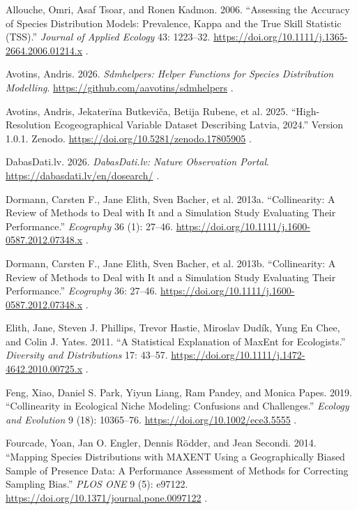 \documentclass[
  openany]{book}
\makeatletter
\newlength{\cslhangindent}
\newenvironment{CSLReferences}[2] %
 {\begin{list}{}{%
  \setlength{\itemindent}{0pt}
  \setlength{\leftmargin}{0pt}
  \setlength{\parsep}{0pt}
  \ifodd #1
   \setlength{\leftmargin}{\cslhangindent}
   \setlength{\itemindent}{-1\cslhangindent}
  \fi
  \setlength{\itemsep}{#2\baselineskip}}}
 {\end{list}}
\def\uline#1{#1}
\DeclareRobustCommand{\EGV@ulineblue}[1]{%
  \begingroup
  \color{linkblue}\uline{#1}%
  \endgroup
}
\let\EGV@oldurl\url
\renewcommand{\url}[1]{%
  \EGV@ulineblue{\EGV@oldurl{#1}}%
}
\makeatother
\begin{document}
\protect{}\label{refs}
\begin{CSLReferences}{1}{1}
Allouche, Omri, Asaf Tsoar, and Ronen Kadmon. 2006. {``Assessing the Accuracy of Species Distribution Models: Prevalence, Kappa and the True Skill Statistic (TSS).''} \emph{Journal of Applied Ecology} 43: 1223--32. \url{https://doi.org/10.1111/j.1365-2664.2006.01214.x}.

Avotins, Andris. 2026. \emph{Sdmhelpers: Helper Functions for Species Distribution Modelling}. \url{https://github.com/aavotins/sdmhelpers}.

Avotins, Andris, Jekaterīna Butkeviča, Betija Rubene, et al. 2025. {``High-Resolution Ecogeographical Variable Dataset Describing Latvia, 2024.''} Version 1.0.1. Zenodo. \url{https://doi.org/10.5281/zenodo.17805905}.

DabasDati.lv. 2026. \emph{DabasDati.lv: Nature Observation Portal}. \url{https://dabasdati.lv/en/dosearch/}.

Dormann, Carsten F., Jane Elith, Sven Bacher, et al. 2013a. {``Collinearity: A Review of Methods to Deal with It and a Simulation Study Evaluating Their Performance.''} \emph{Ecography} 36 (1): 27--46. \url{https://doi.org/10.1111/j.1600-0587.2012.07348.x}.

Dormann, Carsten F., Jane Elith, Sven Bacher, et al. 2013b. {``Collinearity: A Review of Methods to Deal with It and a Simulation Study Evaluating Their Performance.''} \emph{Ecography} 36: 27--46. \url{https://doi.org/10.1111/j.1600-0587.2012.07348.x}.

Elith, Jane, Steven J. Phillips, Trevor Hastie, Miroslav Dudík, Yung En Chee, and Colin J. Yates. 2011. {``A Statistical Explanation of MaxEnt for Ecologists.''} \emph{Diversity and Distributions} 17: 43--57. \url{https://doi.org/10.1111/j.1472-4642.2010.00725.x}.

Feng, Xiao, Daniel S. Park, Yiyun Liang, Ram Pandey, and Monica Papes. 2019. {``Collinearity in Ecological Niche Modeling: Confusions and Challenges.''} \emph{Ecology and Evolution} 9 (18): 10365--76. \url{https://doi.org/10.1002/ece3.5555}.

Fourcade, Yoan, Jan O. Engler, Dennis Rödder, and Jean Secondi. 2014. {``Mapping Species Distributions with MAXENT Using a Geographically Biased Sample of Presence Data: A Performance Assessment of Methods for Correcting Sampling Bias.''} \emph{PLOS ONE} 9 (5): e97122. \url{https://doi.org/10.1371/journal.pone.0097122}.


\end{CSLReferences}
\end{document}
